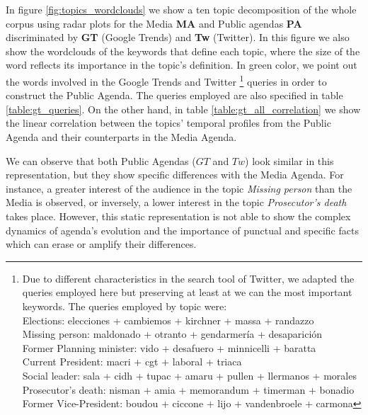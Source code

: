 \documentclass{bmcart}
\begin{document}
\par In figure \ref{fig:topics_wordclouds} we show a ten topic decomposition of the whole corpus using radar plots for the Media \textbf{MA} and Public agendas \textbf{PA} discriminated by \textbf{GT} (Google Trends) and \textbf{Tw} (Twitter). In this figure we also show the wordclouds of the keywords that define each topic, where the size of the word reflects its importance in the topic's definition. In green color, we point out the words involved in the Google Trends and Twitter  \footnote{Due to different characteristics in the search tool of Twitter, we adapted the queries employed here but preserving at least at we can the most important keywords. The queries employed by topic were: \\
Elections: elecciones + cambiemos + kirchner + massa + randazzo \\
Missing person: maldonado + otranto + gendarmer\'ia + desaparici\'on \\
Former Planning minister: vido + desafuero + minnicelli + baratta \\
Current President: macri + cgt + laboral +  triaca \\
Social leader:  sala + cidh + tupac + amaru + pullen + llermanos + morales \\
Prosecutor’s death: nisman + amia + memorandum + timerman +  bonadio \\
Former Vice-President:  boudou + ciccone +  lijo + vandenbroele + carmona
} queries in order to construct the Public Agenda. The queries employed are also specified in table \ref{table:gt_queries}. On the other hand, in table \ref{table:gt_all_correlation} we show the linear correlation between the topics' temporal profiles from the Public Agenda and their counterparts in the Media Agenda.

\par We can observe that both Public Agendas ($GT$ and $Tw$) look similar in this representation, but they show specific differences with the Media Agenda. For instance, a greater interest of the audience in the topic \emph{Missing person} than the Media is observed, or inversely, a lower interest in the topic \emph{Prosecutor's death} takes place. However, this static representation is not able to show the complex dynamics of agenda's evolution and the importance of punctual and specific facts which can erase or amplify their differences. 
\end{document}
